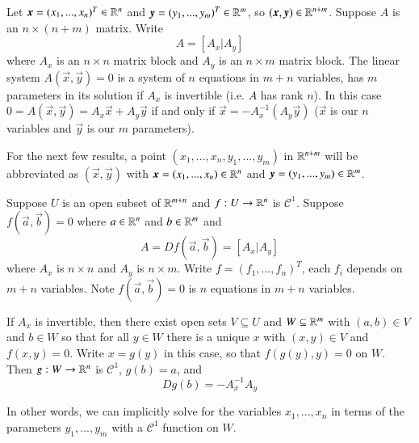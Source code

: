 \begin{eg}
    Let $\vec{x} = (x_1,...,x_n)^T \in \R^n$ and $\vec{y} = (y_1,...,y_m)^T \in \R^m$, so $(\vec{x},\vec{y}) \in \R^{n+m}$. Suppose $A$ is an $n\times (n+m)$ matrix. Write $$A = \left[ A_x \Bigg\vert A_y\right]$$ where $A_x$ is an $n\times n$ matrix block and $A_y$ is an $n\times m$ matrix block. The linear system $A(\vec{x},\vec{y}) = 0$ is a system of $n$ equations in $m+n$ variables, has $m$ parameters in its solution if $A_x$ is invertible (i.e. $A$ has rank $n$). In this case $0 = A(\vec{x},\vec{y}) = A_x\vec{x} + A_y\vec{y}$ if and only if $\vec{x} = -A_x^{-1}(A_y\vec{y})$ ($\vec{x}$ is our $n$ variables and $\vec{y}$ is our $m$ parameters).
\end{eg}

For the next few results, a point $(x_1,...,x_n,y_1,...,y_m)$ in $\mathbb R^{n+m}$ will be abbreviated as $(\vec{x},\vec{y})$ with $\vec{x} = (x_1,...,x_n) \in \R^n$ and $\vec{y} = (y_1,...,y_m) \in \R^m$.

\begin{namthm}
    Suppose $U$ is an open subset of $\mathbb R^{m+n}$ and $f:U\rightarrow \mathbb R^n$ is $\mathcal{C}^1$. Suppose $f(\vec{a},\vec{b}) = 0$ where $a \in \mathbb R^n$ and $b \in \mathbb R^m$ and $$A = Df(\vec{a},\vec{b}) = \left[A_x\Bigg\vert A_y\right]$$ where $A_x$ is $n\times n$ and $A_y$ is $n\times m$. Write $f = (f_1,...,f_n)^T$, each $f_i$ depends on $m+n$ variables. Note $f(\vec{a},\vec{b}) = 0$ is $n$ equations in $m+n$ variables.

    If $A_x$ is invertible, then there exist open sets $V \subseteq U$ and $W \subseteq \mathbb R^m$ with $(a,b) \in V$ and $b \in W$ so that for all $y \in W$ there is a unique $x$ with $(x,y) \in V$ and $f(x,y) = 0$. Write $x = g(y)$ in this case, so that $f(g(y),y) = 0$ on $W$. Then $g:W\rightarrow \mathbb R^n$ is $\mathcal{C}^1$, $g(b) = a$, and $$Dg(b) = -A_x^{-1}A_y$$ 
\end{namthm}

In other words, we can implicitly solve for the variables $x_1,...,x_n$ in terms of the parameters $y_1,...,y_m$ with a $\mathcal{C}^1$ function on $W$.

